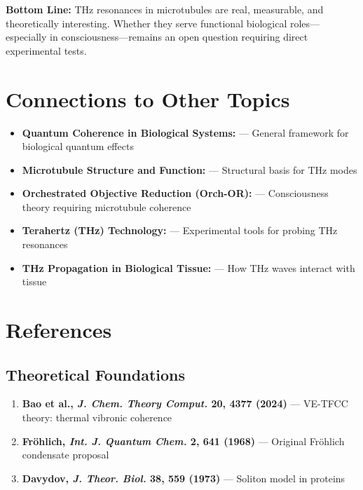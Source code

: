 \begin{keyconcept}
\textbf{Bottom Line:} THz resonances in microtubules are real, measurable, and theoretically interesting. Whether they serve functional biological roles---especially in consciousness---remains an open question requiring direct experimental tests.
\end{keyconcept}

\section{Connections to Other Topics}\label{connections-to-other-wiki-pages}

\begin{itemize}

\item
  \textbf{Quantum Coherence in Biological Systems:} --- General
  framework for biological quantum effects
\item
  \textbf{Microtubule Structure and Function:} --- Structural
  basis for THz modes
\item
  \textbf{Orchestrated Objective Reduction (Orch-OR):} ---
  Consciousness theory requiring microtubule coherence
\item
  \textbf{Terahertz (THz) Technology:} --- Experimental tools for
  probing THz resonances
\item
  \textbf{THz Propagation in Biological Tissue:} --- How THz waves
  interact with tissue
\end{itemize}



\section{References}\label{references}

\subsection{Theoretical Foundations}\label{theoretical-foundations}

\begin{enumerate}
\def\labelenumi{\arabic{enumi}.}

\item
  \textbf{Bao et al., \emph{J. Chem. Theory Comput.} 20, 4377 (2024)}
  --- VE-TFCC theory: thermal vibronic coherence
\item
  \textbf{Fröhlich, \emph{Int. J. Quantum Chem.} 2, 641 (1968)} ---
  Original Fröhlich condensate proposal
\item
  \textbf{Davydov, \emph{J. Theor. Biol.} 38, 559 (1973)} ---
  Soliton model in proteins
\end{enumerate}


